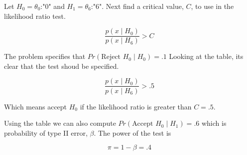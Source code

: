 \documentclass{tufte-book}
\theoremstyle{mytheoremstyle}
\theoremstyle{mylemstyle}
\theoremstyle{mydefstyle}
\begin{document}
\begin{table}
\end{table}

Let $H_0=\theta_0$:"$0$" and $H_1=\theta_6$:"$6$".  Next find a critical value, $C$, to use in the likelihood ratio test.

\[ \frac{p(x\mid H_0)}{p(x\mid H_6)} > C \]

The problem specifies that $Pr(\text{Reject }H_0 \mid H_0)=.1$  Looking at the table, its clear that the test shoud be specified.

\[ \frac{p(x\mid H_0)}{p(x\mid H_6)} > .5 \]

Which means accept $H_0$ if the likelihood ratio is greater than   $C=.5$.

Using the table we can also compute $Pr(\text{Accept }H_0 \mid H_1) = .6$ which is probability of type II error, $\beta$.  The power of the test is

\[ \pi = 1- \beta = .4 \]
\end{document}
